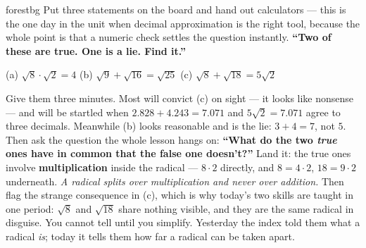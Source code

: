 \documentclass[10pt]{article}
\begin{document}
\begin{skillbox}[Hook]{forestbg}
    Put three statements on the board and hand out calculators --- this is the one day in the unit
    when decimal approximation is the right tool, because the whole point is that a numeric check
    settles the question instantly. \textbf{``Two of these are true. One is a lie. Find it.''}
    \begin{center}
    (a) \; $\sqrt{8}\cdot\sqrt{2}=4$ \qquad (b) \; $\sqrt{9}+\sqrt{16}=\sqrt{25}$ \qquad
    (c) \; $\sqrt{8}+\sqrt{18}=5\sqrt{2}$
    \end{center}
    Give them three minutes. Most will convict (c) on sight --- it looks like nonsense --- and will
    be startled when $2.828+4.243=7.071$ and $5\sqrt2=7.071$ agree to three decimals. Meanwhile (b)
    looks reasonable and is the lie: $3+4=7$, not $5$. Then ask the question the whole lesson hangs
    on: \textbf{``What do the two \emph{true} ones have in common that the false one doesn't?''}
    Land it: the true ones involve \textbf{multiplication} inside the radical --- $8\cdot2$
    directly, and $8=4\cdot2$, $18=9\cdot2$ underneath. \emph{A radical splits over multiplication
    and never over addition.} Then flag the strange consequence in (c), which is why today's two
    skills are taught in one period: $\sqrt8$ and $\sqrt{18}$ share nothing visible, and they are
    the same radical in disguise. You cannot tell until you simplify. Yesterday the index told them
    what a radical \emph{is}; today it tells them how far a radical can be taken apart.
\end{skillbox}
\end{document}
